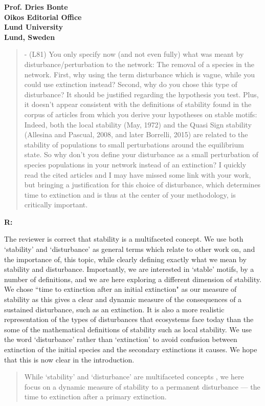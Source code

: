 \documentclass[12pt]{letter}
\begin{document}
\begin{letter}{\bf Prof. Dries Bonte\\
Oikos Editorial Office \\
Lund University \\
Lund, Sweden}
    \begin{quotation}
      - (L81) You only specify now (and not even fully) what was meant by disturbance/perturbation to the network: The removal of a species in the network. First, why using the term disturbance which is vague, while you could use extinction instead? Second, why do you chose this type of disturbance? It should be justified regarding the hypothesis you test. Plus, it doesn't appear consistent with the definitions of stability found in the corpus of articles from which you derive your hypotheses on stable motifs: Indeed, both the local stability (May, 1972) and the Quasi Sign stability (Allesina and Pascual, 2008, and later Borrelli, 2015) are related to the stability of populations to small perturbations around the equilibrium state. So why don't you define your disturbance as a small perturbation of species populations in your network instead of an extinction? I quickly read the cited articles and I may have missed some link with your work, but bringing a justification for this choice of disturbance, which determines time to extinction and is thus at the center of your methodology, is critically important.
    \end{quotation}

      \textbf{R:}
      
      The reviewer is correct that stability is a multifaceted concept. We use both `stability' and `disturbance' as general terms which relate to other work on, and the importance of, this topic, while clearly defining exactly what we mean by stability and disturbance. Importantly, we are interested in `stable' motifs, by a number of definitions, and we are here exploring a different dimension of stability. We chose ``time to extinction after an initial extinction" as our measure of stability as this gives a clear and dynamic measure of the consequences of a sustained disturbance, such as an extinction. It is also a more realistic representation of the types of disturbances that ecosystems face today than the some of the mathematical definitions of stability such as local stability. We use the word `disturbance' rather than `extinction' to avoid confusion between extinction of the initial species and the secondary extinctions it causes.
      We hope that this is now  clear in the introduction.
      
      \begin{quotation}
	While `stability' and `disturbance' are multifaceted concepts \citep{Donohue2013,Radchuck2019}, we here focus on a dynamic measure of stability to a permanent disturbance --- the time to extinction after a primary extinction. 
      \end{quotation}



\end{letter}
\end{document}
